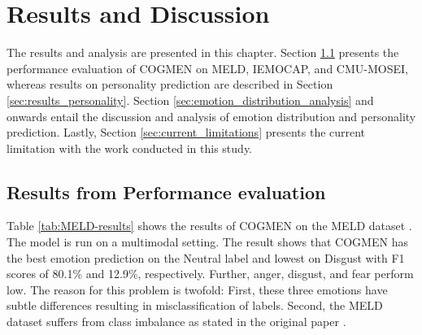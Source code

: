\chapter{Results and Discussion}
\label{chap:results}
The results and analysis are presented in this chapter. Section \ref{sec:performance_evaluation} presents the performance evaluation of COGMEN on MELD, IEMOCAP, and CMU-MOSEI, whereas results on personality prediction are described in Section \ref{sec:results_personality}. Section \ref{sec:emotion_distribution_analysis} and onwards entail the discussion and analysis of emotion distribution and personality prediction. Lastly, Section \ref{sec:current_limitations} presents the current limitation with the work conducted in this study. 

\section{Results from Performance evaluation}
\label{sec:performance_evaluation}
Table \ref{tab:MELD-results} shows the results of COGMEN on the MELD dataset \cite{HP_Advanced}. The model is run on a multimodal setting. The result shows that COGMEN has the best emotion prediction on the Neutral label and lowest on Disgust with F1 scores of 80.1\% and 12.9\%, respectively. Further, anger, disgust, and fear perform low. The reason for this problem is twofold: First, these three emotions have subtle differences resulting in misclassification of labels. Second, the MELD dataset suffers from class imbalance as stated in the original paper \cite{meld_dataset}.   
%
\begin{table}[h]
    \caption{Results on the MELD dataset for 7-emotion class. Avg. denotes the weighted average.}
    \centering
    \label{tab:MELD-results}
\end{table}
%


